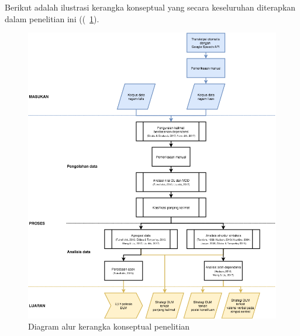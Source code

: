 Berikut adalah ilustrasi kerangka konseptual yang secara keseluruhan diterapkan dalam penelitian ini ((\pic~\ref{fig:kerangka-konseptual}). 
\begin{figure}
	\centering \includegraphics[width=1
	\textwidth] {pics/kerangka-konseptual.png} \caption{ Diagram alur kerangka konseptual penelitian} 
\label{fig:kerangka-konseptual} \end{figure}


